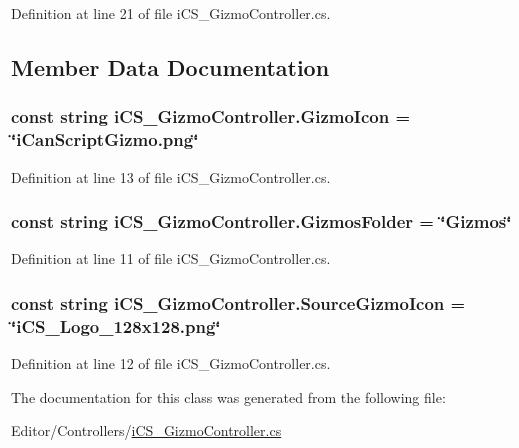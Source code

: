 Definition at line 21 of file i\+C\+S\+\_\+\+Gizmo\+Controller.\+cs.



\subsection{Member Data Documentation}
\hypertarget{classi_c_s___gizmo_controller_a82de1b62eeef07fbe2a58b05f033e0dc}{
\subsubsection[{Gizmo\+Icon}]{\setlength{\rightskip}{0pt plus 5cm}const string i\+C\+S\+\_\+\+Gizmo\+Controller.\+Gizmo\+Icon = \char`\"{}i\+Can\+Script\+Gizmo.\+png\char`\"{}}}\label{classi_c_s___gizmo_controller_a82de1b62eeef07fbe2a58b05f033e0dc}


Definition at line 13 of file i\+C\+S\+\_\+\+Gizmo\+Controller.\+cs.

\hypertarget{classi_c_s___gizmo_controller_a43644406108530d7771cda0f2d938539}{
\subsubsection[{Gizmos\+Folder}]{\setlength{\rightskip}{0pt plus 5cm}const string i\+C\+S\+\_\+\+Gizmo\+Controller.\+Gizmos\+Folder = \char`\"{}Gizmos\char`\"{}}}\label{classi_c_s___gizmo_controller_a43644406108530d7771cda0f2d938539}


Definition at line 11 of file i\+C\+S\+\_\+\+Gizmo\+Controller.\+cs.

\hypertarget{classi_c_s___gizmo_controller_afc73f361975bbf26a031a0d1709fbc82}{
\subsubsection[{Source\+Gizmo\+Icon}]{\setlength{\rightskip}{0pt plus 5cm}const string i\+C\+S\+\_\+\+Gizmo\+Controller.\+Source\+Gizmo\+Icon = \char`\"{}i\+C\+S\+\_\+\+Logo\+\_\+128x128.\+png\char`\"{}}}\label{classi_c_s___gizmo_controller_afc73f361975bbf26a031a0d1709fbc82}


Definition at line 12 of file i\+C\+S\+\_\+\+Gizmo\+Controller.\+cs.



The documentation for this class was generated from the following file\+:\begin{DoxyCompactItemize}
\item 
Editor/\+Controllers/\hyperlink{i_c_s___gizmo_controller_8cs}{i\+C\+S\+\_\+\+Gizmo\+Controller.\+cs}\end{DoxyCompactItemize}

